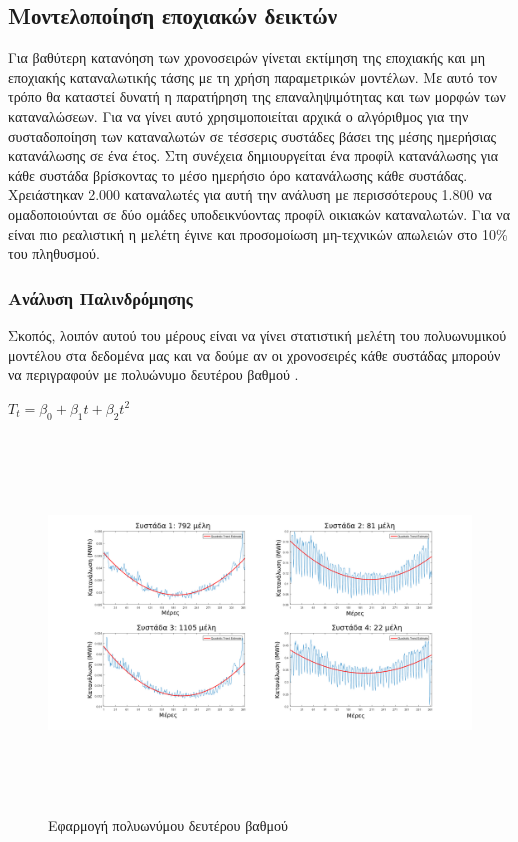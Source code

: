 \subsection{Μοντελοποίηση εποχιακών δεικτών}
Για βαθύτερη κατανόηση των χρονοσειρών γίνεται εκτίμηση της εποχιακής και μη εποχιακής καταναλωτικής τάσης με τη χρήση παραμετρικών μοντέλων. Με αυτό τον τρόπο θα καταστεί δυνατή η παρατήρηση της επαναληψιμότητας και των μορφών των καταναλώσεων. Για να γίνει αυτό χρησιμοποιείται αρχικά ο αλγόριθμος  για την συσταδοποίηση των καταναλωτών σε τέσσερις συστάδες βάσει της μέσης ημερήσιας κατανάλωσης σε ένα έτος. Στη συνέχεια δημιουργείται ένα προφίλ κατανάλωσης για κάθε συστάδα βρίσκοντας το μέσο ημερήσιο όρο κατανάλωσης κάθε συστάδας. Χρειάστηκαν 2.000 καταναλωτές για αυτή την ανάλυση με περισσότερους  1.800 να ομαδοποιούνται σε δύο ομάδες υποδεικνύοντας προφίλ οικιακών καταναλωτών. Για να είναι πιο ρεαλιστική η μελέτη έγινε και προσομοίωση μη-τεχνικών απωλειών στο 10\% του πληθυσμού.
\subsubsection{Ανάλυση Παλινδρόμησης}
Σκοπός, λοιπόν αυτού του μέρους είναι να γίνει στατιστική μελέτη του πολυωνυμικού μοντέλου στα δεδομένα μας και να δούμε αν οι χρονοσειρές κάθε συστάδας μπορούν να περιγραφούν  με πολυώνυμο δευτέρου βαθμού \cite{mathworkstrend}. \par
\begin{center}
$T_t=\beta_0 + \beta_1t + \beta_2t^2$
\end{center}

\begin{figure}[ht!]
\centering
\includegraphics[width=180mm, height=100mm]{../../plots/Trend_estimation/gr_quadratic_Trend_ALL.png}
\caption{Εφαρμογή πολυωνύμου δευτέρου  βαθμού}
\label{fig:quadratic trend}
\end{figure}


